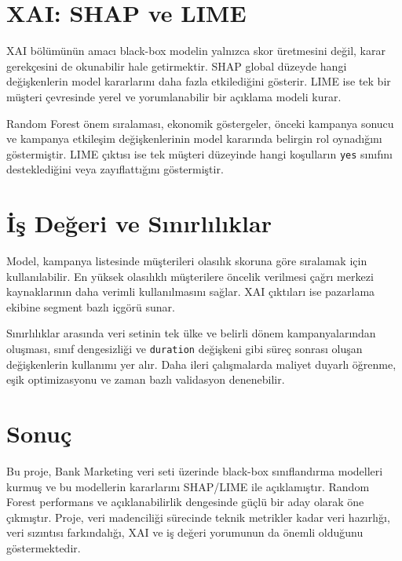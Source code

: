 \documentclass[11pt,a4paper]{article}
\begin{document}
\section{XAI: SHAP ve LIME}
XAI bölümünün amacı black-box modelin yalnızca skor üretmesini değil, karar gerekçesini de okunabilir hale getirmektir. SHAP global düzeyde hangi değişkenlerin model kararlarını daha fazla etkilediğini gösterir. LIME ise tek bir müşteri çevresinde yerel ve yorumlanabilir bir açıklama modeli kurar.

Random Forest önem sıralaması, ekonomik göstergeler, önceki kampanya sonucu ve kampanya etkileşim değişkenlerinin model kararında belirgin rol oynadığını göstermiştir. LIME çıktısı ise tek müşteri düzeyinde hangi koşulların \texttt{yes} sınıfını desteklediğini veya zayıflattığını göstermiştir.

\section{İş Değeri ve Sınırlılıklar}
Model, kampanya listesinde müşterileri olasılık skoruna göre sıralamak için kullanılabilir. En yüksek olasılıklı müşterilere öncelik verilmesi çağrı merkezi kaynaklarının daha verimli kullanılmasını sağlar. XAI çıktıları ise pazarlama ekibine segment bazlı içgörü sunar.

Sınırlılıklar arasında veri setinin tek ülke ve belirli dönem kampanyalarından oluşması, sınıf dengesizliği ve \texttt{duration} değişkeni gibi süreç sonrası oluşan değişkenlerin kullanımı yer alır. Daha ileri çalışmalarda maliyet duyarlı öğrenme, eşik optimizasyonu ve zaman bazlı validasyon denenebilir.

\section{Sonuç}
Bu proje, Bank Marketing veri seti üzerinde black-box sınıflandırma modelleri kurmuş ve bu modellerin kararlarını SHAP/LIME ile açıklamıştır. Random Forest performans ve açıklanabilirlik dengesinde güçlü bir aday olarak öne çıkmıştır. Proje, veri madenciliği sürecinde teknik metrikler kadar veri hazırlığı, veri sızıntısı farkındalığı, XAI ve iş değeri yorumunun da önemli olduğunu göstermektedir.
\end{document}
